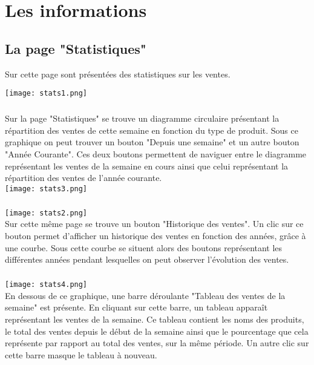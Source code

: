 \chapter{Les informations}

\section{La page "Statistiques"}
Sur cette page sont présentées des statistiques sur les ventes.

\texttt{[image: stats1.png]}
\paragraph{}
Sur la page "Statistiques" se trouve un diagramme circulaire présentant la 
répartition des ventes de cette semaine en fonction du type de produit. Sous 
ce graphique on peut trouver un bouton "Depuis une semaine" et un autre bouton 
"Année Courante". Ces deux boutons permettent de naviguer entre le diagramme 
représentant les ventes de la semaine en cours ainsi que celui représentant la 
répartition des ventes de l'année courante.\\

\texttt{[image: stats3.png]}

\paragraph{}
\texttt{[image: stats2.png]}\\
Sur cette même page se trouve un bouton "Historique des ventes". Un clic sur ce 
bouton permet d'afficher un historique des ventes en fonction des années, 
grâce à une courbe. Sous cette courbe se situent alors des boutons représentant 
les différentes années pendant lesquelles on peut observer l'évolution des ventes.

\paragraph{}
\texttt{[image: stats4.png]}\\
En dessous de ce graphique, une barre déroulante "Tableau des ventes de la 
semaine" est présente. En cliquant sur cette barre, un tableau apparaît 
représentant les ventes de la semaine. Ce tableau contient les noms des 
produits, le total des ventes depuis le début de la semaine ainsi que le 
pourcentage que cela représente par rapport au total des ventes, sur la même 
période. Un autre clic sur cette barre masque le tableau à nouveau.



